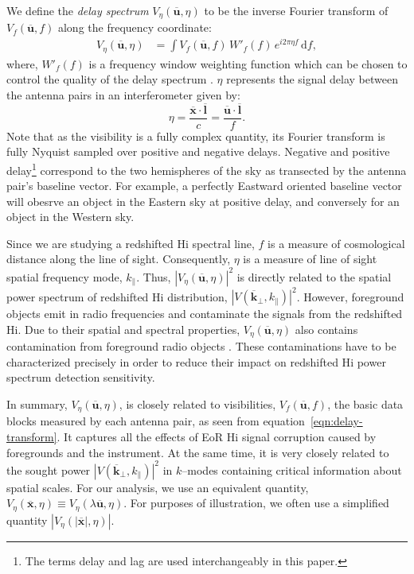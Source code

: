 \documentclass[preprint2,iop,numberedappendix]{emulateapj}
\newcommand{\dif}{\mathrm{d}}
\begin{document}
We define the {\it delay spectrum} $V_\eta(\overline{\mathbf{u}},\eta)$ to be the inverse Fourier transform of $V_f(\overline{\mathbf{u}},f)$ along the frequency coordinate:
\begin{align}\label{eqn:delay-transform}
  V_\eta(\overline{\mathbf{u}},\eta) &= \int V_f(\overline{\mathbf{u}},f)\,W'_f(f)\,e^{i2\pi\eta f}\,\dif f,
\end{align}
where, $W'_f(f)$ is a frequency window weighting function which can be chosen to control the quality of the delay spectrum \citep{thy13,ved12}. $\eta$ represents the signal delay between the antenna pairs in an interferometer given by:
\begin{equation}\label{eqn:delay}
  \eta = \frac{\overline{\mathbf{x}}\cdot\overline{\mathbf{l}}}{c} = \frac{\overline{\mathbf{u}}\cdot\overline{\mathbf{l}}}{f}.
\end{equation}
Note that as the visibility is a fully complex quantity, its Fourier transform is fully Nyquist sampled over positive and negative delays. Negative and positive delay\footnote{The terms delay and lag are used interchangeably in this paper.} correspond to the two hemispheres of the sky as transected by the antenna pair's baseline vector. For example, a perfectly Eastward oriented baseline vector will obesrve an object in the Eastern sky at positive delay, and conversely for an object in the Western sky.  

Since we are studying a redshifted H{\sc i} spectral line, $f$ is a measure of cosmological distance along the line of sight. Consequently, $\eta$ is a measure of line of sight spatial frequency mode, $k_\parallel$. Thus, $|V_\eta(\overline{\mathbf{u}},\eta)|^2$ is directly related to the spatial power spectrum of redshifted H{\sc i} distribution, $|V(\overline{\mathbf{k}}_\perp,k_\parallel)|^2$. However, foreground objects emit in radio frequencies and contaminate the signals from the redshifted H{\sc i}. Due to their spatial and spectral properties, $V_\eta(\overline{\mathbf{u}},\eta)$ also contains contamination from foreground radio objects \citep{thy13,tro12,mor12,bow09}. These contaminations have to be characterized precisely in order to reduce their impact on redshifted H{\sc i} power spectrum detection sensitivity. 

In summary, $V_\eta(\overline{\mathbf{u}},\eta)$, is closely related to visibilities, $V_f(\overline{\mathbf{u}},f)$, the basic data blocks measured by each antenna pair, as seen from equation~\ref{eqn:delay-transform}. It captures all the effects of EoR H{\sc i} signal corruption caused by foregrounds and the instrument. At the same time, it is very closely related to the sought power $|V(\overline{\mathbf{k}}_\perp,k_\parallel)|^2$ in $k$--modes containing critical information about spatial scales. For our analysis, we use an equivalent quantity, $V_\eta(\overline{\mathbf{x}},\eta) \equiv V_\eta(\lambda\overline{\mathbf{u}},\eta)$. For purposes of illustration, we often use a simplified quantity $|V_\eta(|\overline{\mathbf{x}}|,\eta)|$.
\end{document}
